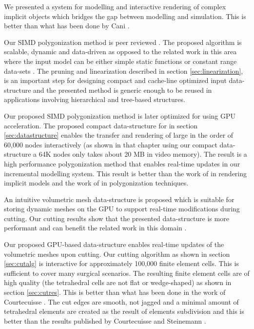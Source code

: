 \label{chapter:conclusion}
We presented a system for modelling and interactive rendering of complex implicit 
objects which bridges the gap between modelling and simulation. This is better than what has been done 
by Cani \etal \cite{Grascuel1997}.  


Our SIMD polygonization method is peer reviewed \cite{Shirazian2012}. The proposed algorithm is 
scalable, dynamic and data-driven as opposed to the related work in this 
area where the input model can be either simple static functions or constant range data-sets 
\cite{Johansson2006, Tatarchuk2007, Knoll2007, Yang2010}. The \blob pruning and linearization 
described in section \ref{sec:linearization}, is an important step for designing compact and cache-line 
optimized input data-structure and the presented method is generic enough to be 
reused in applications involving hierarchical and tree-based structures. 


Our proposed SIMD polygonization method is later optimized for using GPU acceleration. The 
proposed compact data-structure for \blob in section \ref{sec:datastructure} enables the transfer and 
rendering of large \blob in the order of 60,000 nodes interactively (as shown in that chapter using our 
compact data-structure a 64K nodes \blob only takes about 20 MB in video memory).  The result is a 
high performance polygonization method that enables real-time updates in our incremental modelling 
system. This result is better than the work of \cite{Knoll2007, singh2010real} 
in rendering implicit models and the work of \cite{Yang2010, chochlik2012gpu} 
in polygonization techniques.


An intuitive volumetric mesh data-structure is proposed which is suitable for storing dynamic meshes on 
the GPU to support real-time modifications during cutting. Our cutting results show that the presented 
data-structure is more performant and can benefit the related work in this domain 
\cite{Wu2004a, Wu2005, Courtecuisse2010}.

Our proposed GPU-based data-structure enables real-time updates of the volumetric meshes upon 
cutting. Our cutting algorithm as shown in section \ref{sec:cutalg} is interactive for approximately 100,000 finite 
element cells. This is sufficient to cover many surgical scenarios. The resulting finite element 
cells are of high quality (the tetrahedral cells are not flat or wedge-shaped) as shown in section \ref{sec:cutres}. 
This is better than what has been done in the work of Courtecuisse \etal \cite{Courtecuisse2010}.
The cut edges are smooth, not jagged and a minimal amount of tetrahedral elements are 
created as the result of elements subdivision and this is better than the results published by Courtecuisse
\etal and Steinemann \etal \cite{Courtecuisse2010, Steinemann}. 


